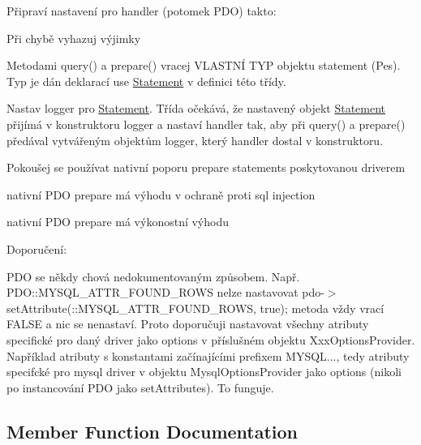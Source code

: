 Připraví nastavení pro handler (potomek P\+DO) takto\+: 
\begin{DoxyItemize}
\item Při chybě vyhazuj výjimky 
\item Metodami query() a prepare() vracej V\+L\+A\+S\+T\+NÍ T\+YP objektu statement (Pes). Typ je dán deklarací use \mbox{\hyperlink{namespace_pes_1_1_database_1_1_statement}{Statement}} v definici této třídy. 
\item Nastav logger pro \mbox{\hyperlink{namespace_pes_1_1_database_1_1_statement}{Statement}}. Třída očekává, že nastavený objekt \mbox{\hyperlink{namespace_pes_1_1_database_1_1_statement}{Statement}} přijímá v konstruktoru logger a nastaví handler tak, aby při query() a prepare() předával vytvářeným objektům logger, který handler dostal v konstruktoru. 
\item Pokoušej se používat nativní poporu prepare statements poskytovanou driverem 
\begin{DoxyItemize}
\item nativní P\+DO prepare má výhodu v ochraně proti sql injection 
\item nativní P\+DO prepare má výkonostní výhodu 
\begin{DoxyItemize}
\item 
\end{DoxyItemize}
\item 
\end{DoxyItemize}

Doporučení\+:



P\+DO se někdy chová nedokumentovaným způsobem. Např. P\+D\+O\+::\+M\+Y\+S\+Q\+L\+\_\+\+A\+T\+T\+R\+\_\+\+F\+O\+U\+N\+D\+\_\+\+R\+O\+WS nelze nastavovat pdo-\/$>$set\+Attribute(\+::\+M\+Y\+S\+Q\+L\+\_\+\+A\+T\+T\+R\+\_\+\+F\+O\+U\+N\+D\+\_\+\+R\+O\+WS, true); metoda vždy vrací F\+A\+L\+SE a nic se nenastaví. Proto doporučuji nastavovat všechny atributy specifické pro daný driver jako options v příslušném objektu Xxx\+Options\+Provider. Například atributy s konstantami začínajícími prefixem M\+Y\+S\+QL..., tedy atributy specifcké pro mysql driver v objektu Mysql\+Options\+Provider jako options (nikoli po instancování P\+DO jako set\+Attributes). To funguje. 
\end{DoxyItemize}

\subsection{Member Function Documentation}
\mbox{\label{class_pes_1_1_database_1_1_handler_1_1_attributes_provider_1_1_attributes_provider_default_a78e4a9edf711d48cd3ec22eaadf560ea}} 
